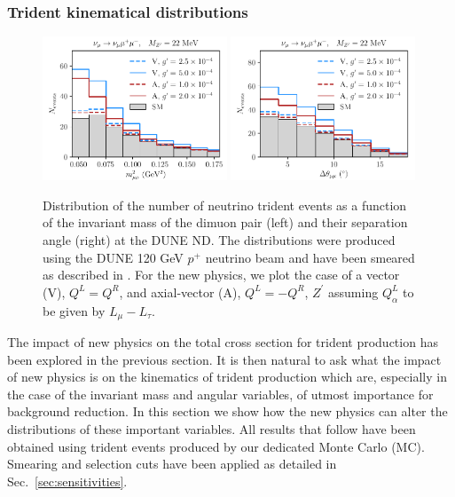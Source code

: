 \subsubsection{Trident kinematical distributions \label{sec:BSM_trident_kinematics}}
%
\begin{figure}[t]
%
\centering
%
\includegraphics[width=0.49\textwidth]{BSM_invmass_mumu.pdf}
\includegraphics[width=0.49\textwidth]{BSM_sepangle_mumu.pdf}
%
\caption[Kinematical distributions for dimuon tridents.]{Distribution of the number of neutrino trident events as a function of the invariant mass of the dimuon pair (left) and their separation angle (right) at the DUNE ND. The distributions were produced using the DUNE 120 GeV $p^+$ neutrino beam and have been smeared as described in . For the new physics, we plot the case of a vector (V), $Q^L = Q^R$, and axial-vector (A), $Q^L = -Q^R$,  $Z^\prime$ assuming $Q^L_{\alpha}$ to be given by $L_\mu - L_\tau$. \label{fig:mm_spectra}}
\end{figure}
%
The impact of new physics on the total cross section for trident production has been explored in the previous section. It is then natural to ask what the impact of new physics is on the kinematics of trident production which are, especially in the case of the invariant mass and angular variables, of utmost importance for background reduction. In this section we show how the new physics can alter the distributions of these important variables. All results that follow have been obtained using trident events produced by our dedicated Monte Carlo (MC). Smearing and selection cuts have been applied as detailed in Sec.~\ref{sec:sensitivities}.

